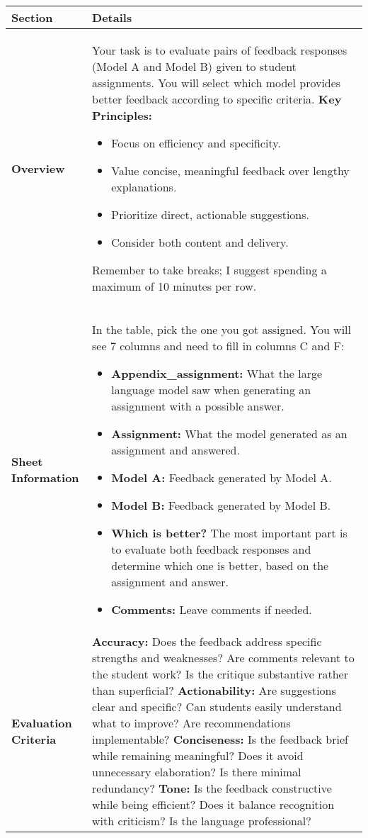 \begin{table*}[t]
\centering
\scriptsize
\renewcommand{\arraystretch}{1.5}
\begin{tabularx}{\textwidth}{|p{3cm}|X|}
\hline
\rowcolor[HTML]{EFEFEF} \textbf{Section} & \textbf{Details} \\ \hline

\textbf{Overview} & 
Your task is to evaluate pairs of feedback responses (Model A and Model B) given to student assignments. You will select which model provides better feedback according to specific criteria.
\newline
\textbf{Key Principles:}
\begin{itemize}
    \item Focus on efficiency and specificity.
    \item Value concise, meaningful feedback over lengthy explanations.
    \item Prioritize direct, actionable suggestions.
    \item Consider both content and delivery.
\end{itemize}
Remember to take breaks; I suggest spending a maximum of 10 minutes per row.
\\ \hline

\textbf{Sheet Information} & 
In the table, pick the one you got assigned. You will see 7 columns and need to fill in columns C and F:
\begin{itemize}
    \item \textbf{Appendix\_assignment:} What the large language model saw when generating an assignment with a possible answer.
    \item \textbf{Assignment:} What the model generated as an assignment and answered.
    \item \textbf{Model A:} Feedback generated by Model A.
    \item \textbf{Model B:} Feedback generated by Model B.
    \item \textbf{Which is better?} The most important part is to evaluate both feedback responses and determine which one is better, based on the assignment and answer.
    \item \textbf{Comments:} Leave comments if needed.
\end{itemize}
\\ \hline

\textbf{Evaluation Criteria} & 
\textbf{Accuracy:} Does the feedback address specific strengths and weaknesses? Are comments relevant to the student work? Is the critique substantive rather than superficial? 
\newline
\textbf{Actionability:} Are suggestions clear and specific? Can students easily understand what to improve? Are recommendations implementable? 
\newline
\textbf{Conciseness:} Is the feedback brief while remaining meaningful? Does it avoid unnecessary elaboration? Is there minimal redundancy? 
\newline
\textbf{Tone:} Is the feedback constructive while being efficient? Does it balance recognition with criticism? Is the language professional? 
\\ \hline


\end{tabularx}
\end{table*}
